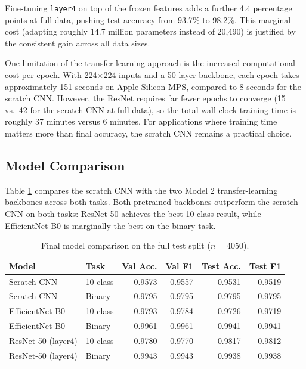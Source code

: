 Fine-tuning \texttt{layer4} on top of the frozen features adds a further 4.4
percentage points at full data, pushing test accuracy from 93.7\% to 98.2\%.
This marginal cost (adapting roughly 14.7 million parameters instead of 20{,}490)
is justified by the consistent gain across all data sizes.

One limitation of the transfer learning approach is the increased computational
cost per epoch. With 224$\times$224 inputs and a 50-layer backbone, each epoch
takes approximately 151 seconds on Apple Silicon MPS, compared to 8 seconds for
the scratch CNN. However, the ResNet requires far fewer epochs to converge
(15 vs.\ 42 for the scratch CNN at full data), so the total wall-clock training
time is roughly 37 minutes versus 6 minutes. For applications where training
time matters more than final accuracy, the scratch CNN remains a practical choice.

\subsection{Model Comparison}

Table \ref{tab:model_comparison} compares the scratch CNN with the two Model 2
transfer-learning backbones across both tasks. Both pretrained backbones
outperform the scratch CNN on both tasks: ResNet-50 achieves the best 10-class
result, while EfficientNet-B0 is marginally the best on the binary task.

\begin{table}[H]
\centering
\caption{Final model comparison on the full test split ($n=4050$).}
\label{tab:model_comparison}
\small
\begin{tabular}{llrrrr}
\toprule
Model & Task & Val Acc. & Val F1 & Test Acc. & Test F1 \\
\midrule
Scratch CNN        & 10-class & 0.9573 & 0.9557 & 0.9531 & 0.9519 \\
Scratch CNN        & Binary   & 0.9795 & 0.9795 & 0.9795 & 0.9795 \\
EfficientNet-B0    & 10-class & 0.9793 & 0.9784 & 0.9726 & 0.9719 \\
EfficientNet-B0    & Binary   & 0.9961 & 0.9961 & 0.9941 & 0.9941 \\
ResNet-50 (layer4) & 10-class & 0.9780 & 0.9770 & 0.9817 & 0.9812 \\
ResNet-50 (layer4) & Binary   & 0.9943 & 0.9943 & 0.9938 & 0.9938 \\
\bottomrule
\end{tabular}
\end{table}

